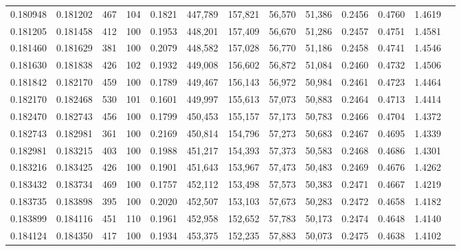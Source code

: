 \begin{tabular}{rrrrrrrrrrrrr}
0.180948 & 0.181202 &   467 & 104 &                                     0.1821 & 447,789 & 157,821 &  56,570 &  51,386 & 0.2456 & 0.4760 & 1.4619 \\
0.181205 & 0.181458 &   412 & 100 &                                     0.1953 & 448,201 & 157,409 &  56,670 &  51,286 & 0.2457 & 0.4751 & 1.4581 \\
0.181460 & 0.181629 &   381 & 100 &                                     0.2079 & 448,582 & 157,028 &  56,770 &  51,186 & 0.2458 & 0.4741 & 1.4546 \\
0.181630 & 0.181838 &   426 & 102 &                                     0.1932 & 449,008 & 156,602 &  56,872 &  51,084 & 0.2460 & 0.4732 & 1.4506 \\
0.181842 & 0.182170 &   459 & 100 &                                     0.1789 & 449,467 & 156,143 &  56,972 &  50,984 & 0.2461 & 0.4723 & 1.4464 \\
0.182170 & 0.182468 &   530 & 101 &                                     0.1601 & 449,997 & 155,613 &  57,073 &  50,883 & 0.2464 & 0.4713 & 1.4414 \\
0.182470 & 0.182743 &   456 & 100 &                                     0.1799 & 450,453 & 155,157 &  57,173 &  50,783 & 0.2466 & 0.4704 & 1.4372 \\
0.182743 & 0.182981 &   361 & 100 &                                     0.2169 & 450,814 & 154,796 &  57,273 &  50,683 & 0.2467 & 0.4695 & 1.4339 \\
0.182981 & 0.183215 &   403 & 100 &                                     0.1988 & 451,217 & 154,393 &  57,373 &  50,583 & 0.2468 & 0.4686 & 1.4301 \\
0.183216 & 0.183425 &   426 & 100 &                                     0.1901 & 451,643 & 153,967 &  57,473 &  50,483 & 0.2469 & 0.4676 & 1.4262 \\
0.183432 & 0.183734 &   469 & 100 &                                     0.1757 & 452,112 & 153,498 &  57,573 &  50,383 & 0.2471 & 0.4667 & 1.4219 \\
0.183735 & 0.183898 &   395 & 100 &                                     0.2020 & 452,507 & 153,103 &  57,673 &  50,283 & 0.2472 & 0.4658 & 1.4182 \\
0.183899 & 0.184116 &   451 & 110 &                                     0.1961 & 452,958 & 152,652 &  57,783 &  50,173 & 0.2474 & 0.4648 & 1.4140 \\
0.184124 & 0.184350 &   417 & 100 &                                     0.1934 & 453,375 & 152,235 &  57,883 &  50,073 & 0.2475 & 0.4638 & 1.4102 \\

\end{tabular}
